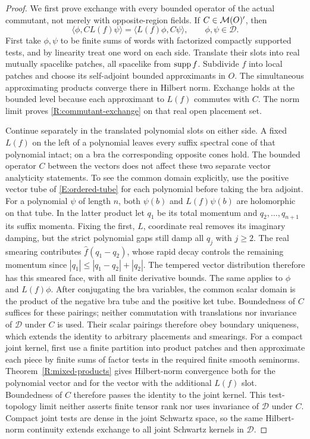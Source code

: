 \begin{proof}
We first prove exchange with every bounded operator of the actual
commutant, not merely with opposite-region fields.  If
$C\in\mathcal M(O)'$, then
\begin{equation}\label{R:commutant-exchange}
 \langle\phi,CL(f)\psi\rangle
       =\langle L(f)\phi,C\psi\rangle,
           \qquad \phi,\psi\in\mathcal D.
\end{equation}
First take $\phi,\psi$ to be finite sums of words with factorized
compactly supported tests, and by linearity treat one word on each
side.  Translate their slots into real mutually
spacelike patches, all spacelike from $\operatorname{supp} f$.  Subdivide $f$ into
local patches and choose its self-adjoint bounded approximants in
$O$.  The simultaneous approximating products converge there in
Hilbert norm.  Exchange holds at the bounded level because each
approximant to $L(f)$ commutes with $C$.  The norm limit proves
\eqref{R:commutant-exchange} on that real open placement set.

Continue separately in the translated polynomial slots on either
side.  A fixed $L(f)$ on the left of a polynomial leaves every suffix
spectral cone of that polynomial intact; on a bra the corresponding
opposite cones hold.  The bounded operator $C$ between the vectors
does not affect these two separate vector analyticity statements.
To see the common domain explicitly, use the positive vector tube
of \eqref{E:ordered-tube} for each polynomial before taking the bra
adjoint.  For a polynomial $\psi$ of length $n$, both $\psi(b)$ and
$L(f)\psi(b)$ are holomorphic on that tube.  In the latter product
let $q_1$ be its total momentum and
$q_2,\ldots,q_{n+1}$ its suffix momenta.  Fixing the first, $L$,
coordinate real removes its imaginary damping, but the strict
polynomial gaps still damp all $q_j$ with $j\geq2$.
The real smearing contributes $\widehat f(q_1-q_2)$, whose rapid
decay controls the remaining momentum since
$|q_1|\leq|q_1-q_2|+|q_2|$.  The tempered vector distribution
therefore has this smeared face, with all finite derivative bounds.
The same applies to $\phi$ and $L(f)\phi$.  After conjugating the
bra variables, the common scalar domain is the product of the
negative bra tube and the positive ket tube.  Boundedness of $C$
suffices for these pairings; neither commutation with translations
nor invariance of $\mathcal D$ under $C$ is used.
Their scalar pairings therefore obey boundary uniqueness, which
extends the identity to arbitrary placements and smearings.
For a compact joint kernel, first use a finite partition into product
patches and then approximate each piece by finite sums of factor
tests in the required finite smooth seminorms.  Theorem~\ref{R:mixed-products}
gives Hilbert-norm convergence both for the polynomial vector and
for the vector with the additional $L(f)$ slot.  Boundedness of $C$
therefore passes the identity to the joint kernel.  This test-topology
limit neither asserts finite tensor rank nor uses invariance of
$\mathcal D$ under $C$.  Compact joint tests are dense in the joint
Schwartz space, so the same Hilbert-norm continuity extends exchange
to all joint Schwartz kernels in $\mathcal D$.


\end{proof}
